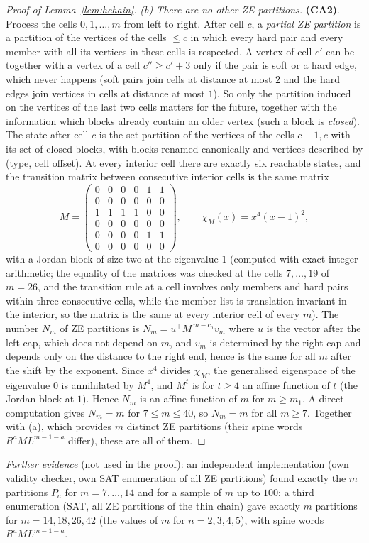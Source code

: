 \begin{proof}[Proof of Lemma~\ref{lem:hchain}]
\emph{(b) There are no other ZE partitions.} \textbf{(CA2)}. Process the cells $0,1,\dots,m$ from left to right. After cell $c$, a \emph{partial ZE partition} is a partition of the vertices of the cells $\le c$ in which every hard pair and every member with all its vertices in these cells is respected. A vertex of cell $c'$ can be together with a vertex of a cell $c''\ge c'+3$ only if the pair is soft or a hard edge, which never happens (soft pairs join cells at distance at most $2$ and the hard edges join vertices in cells at distance at most $1$). So only the partition induced on the vertices of the last two cells matters for the future, together with the information which blocks already contain an older vertex (such a block is \emph{closed}). The state after cell $c$ is the set partition of the vertices of the cells $c-1,c$ with its set of closed blocks, with blocks renamed canonically and vertices described by (type, cell offset). At every interior cell there are exactly six reachable states, and the transition matrix between consecutive interior cells is the same matrix
\[
M=\begin{pmatrix}0&0&0&0&1&1\\0&0&0&0&0&0\\1&1&1&1&0&0\\0&0&0&0&0&0\\0&0&0&0&1&1\\0&0&0&0&0&0\end{pmatrix},\qquad\chi_M(x)=x^4(x-1)^2 ,
\]
with a Jordan block of size two at the eigenvalue $1$ (computed with exact integer arithmetic; the equality of the matrices was checked at the cells $7,\dots,19$ of $m=26$, and the transition rule at a cell involves only members and hard pairs within three consecutive cells, while the member list is translation invariant in the interior, so the matrix is the same at every interior cell of every $m$). The number $N_m$ of ZE partitions is $N_m=u^{\top}M^{\,m-c_0}v_m$ where $u$ is the vector after the left cap, which does not depend on $m$, and $v_m$ is determined by the right cap and depends only on the distance to the right end, hence is the same for all $m$ after the shift by the exponent. Since $x^4$ divides $\chi_M$, the generalised eigenspace of the eigenvalue $0$ is annihilated by $M^4$, and $M^{t}$ is for $t\ge4$ an affine function of $t$ (the Jordan block at $1$). Hence $N_m$ is an affine function of $m$ for $m\ge m_1$. A direct computation gives $N_m=m$ for $7\le m\le40$, so $N_m=m$ for all $m\ge7$. Together with (a), which provides $m$ distinct ZE partitions (their spine words $R^aML^{m-1-a}$ differ), these are all of them.
\end{proof}
\emph{Further evidence} (not used in the proof): an independent implementation (own validity checker, own SAT enumeration of all ZE partitions) found exactly the $m$ partitions $P_a$ for $m=7,\dots,14$ and for a sample of $m$ up to $100$; a third enumeration (SAT, all ZE partitions of the thin chain) gave exactly $m$ partitions for $m=14,18,26,42$ (the values of $m$ for $n=2,3,4,5$), with spine words $R^aML^{m-1-a}$.


